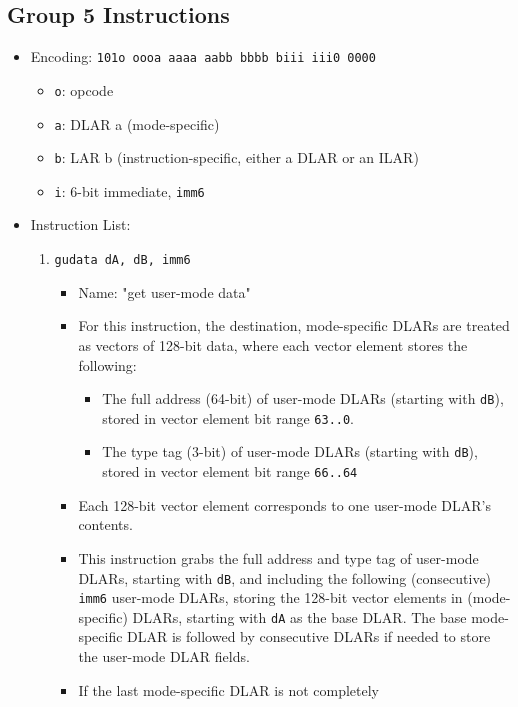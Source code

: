 \documentclass{article}
\begin{document}
	\subsection{Group 5 Instructions}
		\begin{itemize}
		\item Encoding:  \texttt{101o oooa aaaa aabb  bbbb biii iii0 0000}
			\begin{itemize}
			\item \texttt{o}:  opcode
			\item \texttt{a}:  DLAR a (mode-specific)
			\item \texttt{b}:  LAR b (instruction-specific, either a DLAR
				or an ILAR)
			\item \texttt{i}:  6-bit immediate, \texttt{imm6}
			\end{itemize}
		\item Instruction List:
			\begin{enumerate}
			\item \texttt{gudata dA, dB, imm6}
				\begin{itemize}
				\item Name:  "get user-mode data"
				\item For this instruction, the destination, mode-specific
					DLARs are treated as vectors of 128-bit data, where
					each vector element stores the following:
					\begin{itemize}
					\item The full address (64-bit) of user-mode DLARs
						(starting with \texttt{dB}), stored in vector
						element bit range \texttt{63..0}.
					\item The type tag (3-bit) of user-mode DLARs (starting
						with \texttt{dB}), stored in vector element bit
						range \texttt{66..64}
					\end{itemize}
				\item Each 128-bit vector element corresponds to one
					user-mode DLAR's contents.
				\item This instruction grabs the full address and type tag
					of user-mode DLARs, starting with \texttt{dB}, and
					including the following (consecutive) \texttt{imm6}
					user-mode DLARs, storing the 128-bit vector elements in
					(mode-specific) DLARs, starting with \texttt{dA} as the
					base DLAR.  The base mode-specific DLAR is followed by
					consecutive DLARs if needed to store the user-mode DLAR
					fields.
				\item If the last mode-specific DLAR is not completely

\end{itemize}
\end{enumerate}
\end{itemize}
\end{document}
